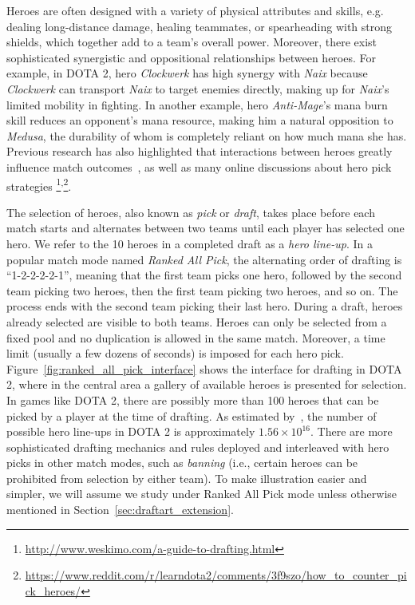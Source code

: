 Heroes are often designed with a variety of physical attributes and skills, e.g. dealing long-distance damage, healing teammates, or spearheading with strong shields, which together add to a team's overall power. Moreover, there exist sophisticated synergistic and oppositional relationships between heroes. For example, in DOTA 2, hero \textit{Clockwerk} has high synergy with \textit{Naix} because \textit{Clockwerk} can transport \textit{Naix} to target enemies directly, making up for \textit{Naix}'s limited mobility in fighting. In another example, hero \textit{Anti-Mage}'s mana burn skill reduces an opponent's mana resource, making him a natural opposition to \textit{Medusa}, the durability of whom is completely reliant on how much mana she has. Previous research has also highlighted that interactions between heroes greatly influence match outcomes~\cite{pobie1,Semenov2016,kim2016proficiency}, as well as many online discussions about hero pick strategies \footnote{\url{http://www.weskimo.com/a-guide-to-drafting.html}}\textsuperscript{,}\footnote{\url{https://www.reddit.com/r/learndota2/comments/3f9szo/how_to_counter_pick_heroes/}}. 
 
 
The selection of heroes, also known as \textit{pick} or \textit{draft}, takes place before each match starts and alternates between two teams until each player has selected one hero. We refer to the 10 heroes in a completed draft as a \textit{hero line-up}. In a popular match mode named \textit{Ranked All Pick}, the alternating order of drafting is ``1-2-2-2-2-1'', meaning that the first team picks one hero, followed by the second team picking two heroes, then the first team picking two heroes, and so on. The process ends with the second team picking their last hero. During a draft, heroes already selected are visible to both teams. Heroes can only be selected from a fixed pool and no duplication is allowed in the same match. Moreover, a time limit (usually a few dozens of seconds) is imposed for each hero pick. Figure~\ref{fig:ranked_all_pick_interface} shows the interface for drafting in DOTA 2, where in the central area a gallery of available heroes is presented for selection. In games like DOTA 2, there are possibly more than 100 heroes that can be picked by a player at the time of drafting. As estimated by~\cite{hanke2017reco}, the number of possible hero line-ups in DOTA 2 is approximately $1.56 \times 10^{16}$. There are more sophisticated drafting mechanics and rules deployed and interleaved with hero picks in other match modes, such as \textit{banning} (i.e., certain heroes can be prohibited from selection by either team). To make illustration easier and simpler, we will assume we study under Ranked All Pick mode unless otherwise mentioned in Section~\ref{sec:draftart_extension}.

